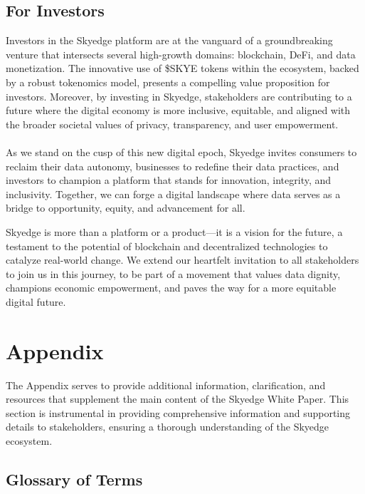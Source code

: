 \documentclass{article}
\begin{document}
\subsection*{For Investors}
Investors in the Skyedge platform are at the vanguard of a groundbreaking venture that intersects several high-growth domains: blockchain, DeFi, and data monetization. The innovative use of \$SKYE tokens within the ecosystem, backed by a robust tokenomics model, presents a compelling value proposition for investors. Moreover, by investing in Skyedge, stakeholders are contributing to a future where the digital economy is more inclusive, equitable, and aligned with the broader societal values of privacy, transparency, and user empowerment.

\paragraph{}
\paragraph{}

As we stand on the cusp of this new digital epoch, Skyedge invites consumers to reclaim their data autonomy, businesses to redefine their data practices, and investors to champion a platform that stands for innovation, integrity, and inclusivity. Together, we can forge a digital landscape where data serves as a bridge to opportunity, equity, and advancement for all.

 Skyedge is more than a platform or a product—it is a vision for the future, a testament to the potential of blockchain and decentralized technologies to catalyze real-world change. We extend our heartfelt invitation to all stakeholders to join us in this journey, to be part of a movement that values data dignity, champions economic empowerment, and paves the way for a more equitable digital future.

\pagebreak

\section{Appendix}
The Appendix serves to provide additional information, clarification, and resources that supplement the main content of the Skyedge White Paper. This section is instrumental in providing comprehensive information and supporting details to stakeholders, ensuring a thorough understanding of the Skyedge ecosystem.

\subsection{Glossary of Terms}
\end{document}
